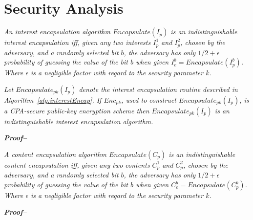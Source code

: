 \section{Security Analysis}\label{sec:sec-analysis}






\begin{definition}
\textit{
An interest encapsulation algorithm $Encapsulate(I_p)$ is an indistinguishable interest encapsulation iff, given any two interests $I_p^1$ and $I_p^2$, chosen by the adversary, and a randomly selected bit $b$, the adversary has only $1/2 + \epsilon$ probability of guessing the value of the bit $b$ when given $I_e^b = Encapsulate(I_p^b)$. Where $\epsilon$ is a negligible factor with regard to the security parameter $k$.
}
\end{definition}

\begin{theorem}
\textit{
Let $Encapsulate_{pk}(I_p)$ denote the interest encapsulation routine described in Algorithm~\ref{alg:interestEncap}. If $Enc_{pk}$, used to construct $Encapsulate_{pk}(I_p)$, is a CPA-secure public-key encryption scheme then $Encapsulate_{pk}(I_p)$ is an indistinguishable interest encapsulation algorithm.
}
\end{theorem}

\textit{\textbf{Proof--}}


\begin{definition}
\textit{
A content encapsulation algorithm $Encapsulate(C_p)$ is an indistinguishable content encapsulation iff, given any two contents $C_p^1$ and $C_p^2$, chosen by the adversary, and a randomly selected bit $b$, the adversary has only $1/2 + \epsilon$ probability of guessing the value of the bit $b$ when given $C_e^b = Encapsulate(C_p^b)$. Where $\epsilon$ is a negligible factor with regard to the security parameter $k$.
}
\end{definition}


\textbf{\textit{Proof--}}
